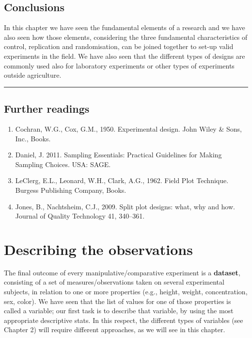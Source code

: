 \documentclass[a4paper,12pt,oneside]{book}
\providecommand{\tightlist}{%
  \setlength{\itemsep}{0pt}\setlength{\parskip}{0pt}}
\begin{document}
\hypertarget{conclusions-1}{%
\section{Conclusions}\label{conclusions-1}}

In this chapter we have seen the fundamental elements of a research and we have also seen how those elements, considering the three fundamental characteristics of control, replication and randomisation, can be joined together to set-up valid experiments in the field. We have also seen that the different types of designs are commonly used also for laboratory experiments or other types of experiments outside agriculture.

\begin{center}\rule{0.5\linewidth}{0.5pt}\end{center}

\hypertarget{further-readings-1}{%
\section{Further readings}\label{further-readings-1}}

\begin{enumerate}
\def\labelenumi{\arabic{enumi}.}
\tightlist
\item
  Cochran, W.G., Cox, G.M., 1950. Experimental design. John Wiley \& Sons, Inc., Books.
\item
  Daniel, J. 2011. Sampling Essentials: Practical Guidelines for Making Sampling Choices. USA: SAGE.
\item
  LeClerg, E.L., Leonard, W.H., Clark, A.G., 1962. Field Plot Technique. Burgess Publishing Company, Books.
\item
  Jones, B., Nachtsheim, C.J., 2009. Split plot designs: what, why and how. Journal of Quality Technology 41, 340--361.
\end{enumerate}

\hypertarget{describing-the-observations}{%
\chapter{Describing the observations}\label{describing-the-observations}}

The final outcome of every manipulative/comparative experiment is a \textbf{dataset}, consisting of a set of measures/observations taken on several experimental subjects, in relation to one or more properties (e.g., height, weight, concentration, sex, color). We have seen that the list of values for one of those properties is called a variable; our first task is to describe that variable, by using the most appropriate descriptive stats. In this respect, the different types of variables (see Chapter 2) will require different approaches, as we will see in this chapter.
\end{document}
